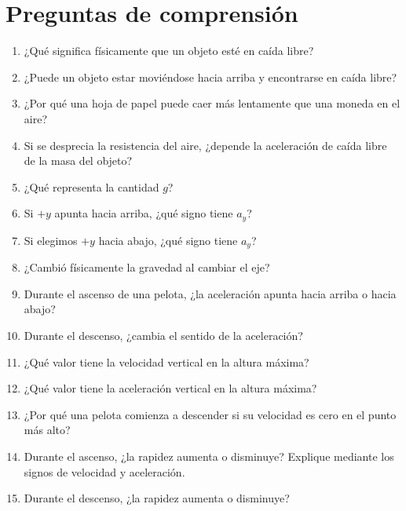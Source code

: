 \section{Preguntas de comprensión}

\begin{enumerate}
    \item ¿Qué significa físicamente que un objeto esté en caída libre?

    \item ¿Puede un objeto estar moviéndose hacia arriba y encontrarse en caída libre?

    \item ¿Por qué una hoja de papel puede caer más lentamente que una moneda en el aire?

    \item Si se desprecia la resistencia del aire, ¿depende la aceleración de caída libre de la masa del objeto?

    \item ¿Qué representa la cantidad \(g\)?

    \item Si \(+y\) apunta hacia arriba, ¿qué signo tiene \(a_y\)?

    \item Si elegimos \(+y\) hacia abajo, ¿qué signo tiene \(a_y\)?

    \item ¿Cambió físicamente la gravedad al cambiar el eje?

    \item Durante el ascenso de una pelota, ¿la aceleración apunta hacia arriba o hacia abajo?

    \item Durante el descenso, ¿cambia el sentido de la aceleración?

    \item ¿Qué valor tiene la velocidad vertical en la altura máxima?

    \item ¿Qué valor tiene la aceleración vertical en la altura máxima?

    \item ¿Por qué una pelota comienza a descender si su velocidad es cero en el punto más alto?

    \item Durante el ascenso, ¿la rapidez aumenta o disminuye? Explique mediante los signos de velocidad y aceleración.

    \item Durante el descenso, ¿la rapidez aumenta o disminuye?


\end{enumerate}
